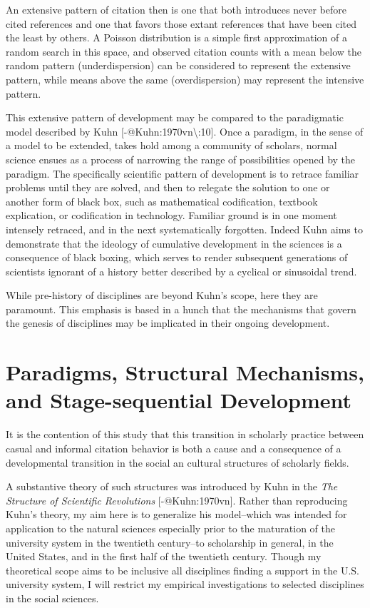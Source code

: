 \documentclass[]{article}
\begin{document}
An extensive pattern of citation then is one that both introduces never
before cited references and one that favors those extant references that
have been cited the least by others. A Poisson distribution is a simple
first approximation of a random search in this space, and observed
citation counts with a mean below the random pattern (underdispersion)
can be considered to represent the extensive pattern, while means above
the same (overdispersion) may represent the intensive pattern.

This extensive pattern of development may be compared to the
paradigmatic model described by Kuhn
{[}-@Kuhn:1970vn\textbackslash{}:10{]}. Once a paradigm, in the sense of
a model to be extended, takes hold among a community of scholars, normal
science ensues as a process of narrowing the range of possibilities
opened by the paradigm. The specifically scientific pattern of
development is to retrace familiar problems until they are solved, and
then to relegate the solution to one or another form of black box, such
as mathematical codification, textbook explication, or codification in
technology. Familiar ground is in one moment intensely retraced, and in
the next systematically forgotten. Indeed Kuhn aims to demonstrate that
the ideology of cumulative development in the sciences is a consequence
of black boxing, which serves to render subsequent generations of
scientists ignorant of a history better described by a cyclical or
sinusoidal trend.

While pre-history of disciplines are beyond Kuhn's scope, here they are
paramount. This emphasis is based in a hunch that the mechanisms that
govern the genesis of disciplines may be implicated in their ongoing
development.

\section{Paradigms, Structural Mechanisms, and Stage-sequential
Development}\label{paradigms-structural-mechanisms-and-stage-sequential-development}

It is the contention of this study that this transition in scholarly
practice between casual and informal citation behavior is both a cause
and a consequence of a developmental transition in the social an
cultural structures of scholarly fields.

A substantive theory of such structures was introduced by Kuhn in the
\emph{The Structure of Scientific Revolutions} {[}-@Kuhn:1970vn{]}.
Rather than reproducing Kuhn's theory, my aim here is to generalize his
model--which was intended for application to the natural sciences
especially prior to the maturation of the university system in the
twentieth century--to scholarship in general, in the United States, and
in the first half of the twentieth century. Though my theoretical scope
aims to be inclusive all disciplines finding a support in the U.S.
university system, I will restrict my empirical investigations to
selected disciplines in the social sciences.
\end{document}
